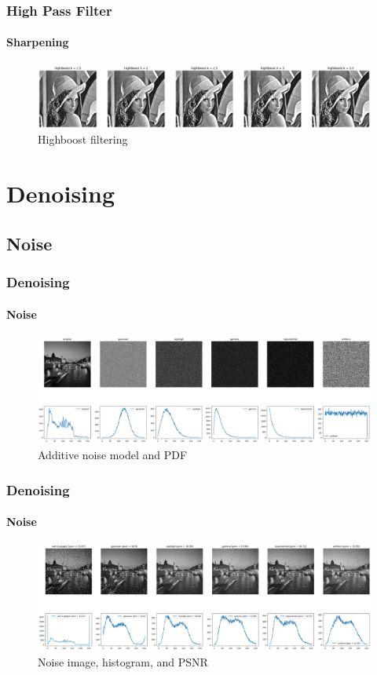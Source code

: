 \documentclass[
	11pt, %
	aspectratio=169, %
]{beamer}
\begin{document}
		\begin{frame}
			\frametitle{High Pass Filter}
			\framesubtitle{Sharpening}

			\begin{figure}[H]
				\includegraphics[width = \linewidth]{sharp_2.png}
				\caption{Highboost filtering}
			\end{figure}
		\end{frame}

\section{Denoising}

	\subsection{Noise}

		\begin{frame}
			\frametitle{Denoising}
			\framesubtitle{Noise}

			\begin{figure}[H]
				\includegraphics[width = \linewidth]{noise_1.png}
				\caption{Additive noise model and PDF}
				\label{fig:noise_1}
			\end{figure}
		\end{frame}
	
		\begin{frame}
			\frametitle{Denoising}
			\framesubtitle{Noise}

			\begin{figure}[H]
				\includegraphics[width = \linewidth]{noise_2.png}
				\caption{Noise image, histogram, and PSNR}
				\label{fig:noise_2}
			\end{figure}
		\end{frame}
\end{document}
